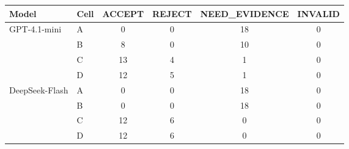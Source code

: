 \begin{tabular}{llcccc}
\toprule
Model & Cell & ACCEPT & REJECT & NEED\_EVIDENCE & INVALID \\
\midrule
\multirow{4}{*}{GPT-4.1-mini} & A & 0 & 0 & 18 & 0 \\
 & B & 8 & 0 & 10 & 0 \\
 & C & 13 & 4 & 1 & 0 \\
 & D & 12 & 5 & 1 & 0 \\ \midrule
\multirow{4}{*}{DeepSeek-Flash} & A & 0 & 0 & 18 & 0 \\
 & B & 0 & 0 & 18 & 0 \\
 & C & 12 & 6 & 0 & 0 \\
 & D & 12 & 6 & 0 & 0 \\
\bottomrule
\end{tabular}
